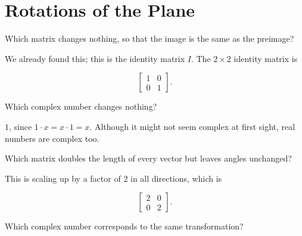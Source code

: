 \documentclass[../gatm_answers.tex]{subfiles}
\begin{document}
\section{Rotations of the Plane}

\newcommand{\Mat}{\operatorname{M}}

\begin{outer_problem}[start=1]
\item \label{prob:pr_start}
\end{outer_problem}

\begin{inner_problem}[start=1]
\item Which matrix changes nothing, so that the image is the same as the preimage?
\end{inner_problem}

We already found this; this is the identity matrix $I$. The $2\times 2$ identity matrix is

$$\begin{bmatrix} 1 & 0 \\ 0 & 1 \end{bmatrix}.$$

\begin{inner_problem}
\item Which complex number changes nothing?
\end{inner_problem}

$1$, since $1\cdot x = x\cdot 1 = x$. Although it might not seem complex at first sight, real numbers are complex too.

\begin{outer_problem}
\item 
\end{outer_problem}

\begin{inner_problem}[start=1]
\item Which matrix doubles the length of every vector but leaves angles unchanged?
\end{inner_problem}

This is scaling up by a factor of $2$ in all directions, which is

$$\begin{bmatrix} 2 & 0 \\ 0 & 2 \end{bmatrix}.$$

\begin{inner_problem}
\item Which complex number corresponds to the same transformation?
\end{inner_problem}
\end{document}
